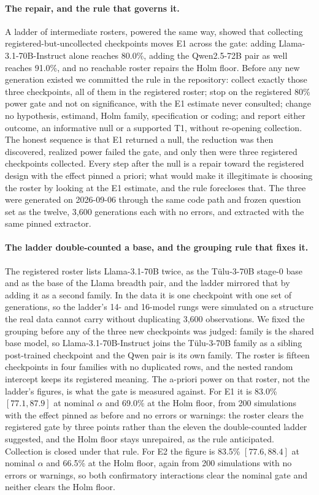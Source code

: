 \paragraph{The repair, and the rule that governs it.}
A ladder of intermediate rosters, powered the same way, showed that collecting
registered-but-uncollected checkpoints moves E1 across the gate: adding
Llama-3.1-70B-Instruct alone reaches 80.0\%, adding the Qwen2.5-72B pair as
well reaches 91.0\%, and no reachable roster repairs the Holm floor. Before any
new generation existed we committed the rule in the repository: collect
exactly those three checkpoints, all of them in the registered roster; stop on
the registered 80\% power gate and not on significance, with the E1 estimate
never consulted; change no hypothesis, estimand, Holm family, specification or
coding; and report either outcome, an informative null or a supported T1,
without re-opening collection. The honest sequence is that E1 returned a null,
the reduction was then discovered, realized power failed the gate, and only then
were three registered checkpoints collected. Every step after the null is a
repair toward the registered design with the effect pinned a priori; what would
make it illegitimate is choosing the roster by looking at the E1 estimate, and
the rule forecloses that. The three were generated on 2026-09-06 through the
same code path and frozen question set as the twelve, 3,600 generations each
with no errors, and extracted with the same pinned extractor.

\paragraph{The ladder double-counted a base, and the grouping rule that fixes it.}
The registered roster lists Llama-3.1-70B twice, as the Tülu-3-70B stage-0
base and as the base of the Llama breadth pair, and the ladder mirrored that by
adding it as a second family. In the data it is one checkpoint with one set of
generations, so the ladder's 14- and 16-model rungs were simulated on a
structure the real data cannot carry without duplicating 3,600 observations. We
fixed the grouping before any of the three new checkpoints was judged: family
is the shared base model, so Llama-3.1-70B-Instruct joins the Tülu-3-70B family
as a sibling post-trained checkpoint and the Qwen pair is its own family. The
roster is fifteen checkpoints in four families with no duplicated rows, and the
nested random intercept keeps its registered meaning. The a-priori power on
that roster, not the ladder's figures, is what the gate is measured against.
For E1 it is 83.0\% $[77.1, 87.9]$ at nominal $\alpha$ and 69.0\% at the Holm
floor, from 200 simulations with the effect pinned as before and no errors or
warnings: the roster clears the registered gate by three points rather than the
eleven the double-counted ladder suggested, and the Holm floor stays unrepaired,
as the rule anticipated. Collection is closed under that rule. For E2 the
figure is 83.5\% $[77.6, 88.4]$ at nominal $\alpha$ and 66.5\% at the Holm
floor, again from 200 simulations with no errors or warnings, so both
confirmatory interactions clear the nominal gate and neither clears the Holm
floor.

